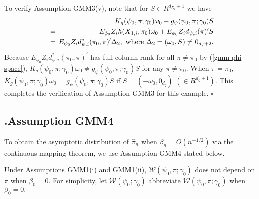 \documentclass[12pt,titlepage,final,oneside,letterpaper]{article}
\begin{document}
To verify Assumption GMM3(v), note that for $S\in R^{d_{X_{2}}+1}$ we have%
\begin{eqnarray}
&&K_{g}(\psi _{0},\pi ;\gamma _{0})\omega _{0}-g_{\psi }(\psi _{0},\pi
;\gamma _{0})S  \notag \\
\hspace{-0.08in} &=&\hspace{-0.08in}E_{\phi _{0}}Z_{i}h(X_{1,i},\pi
_{0})\omega _{0}+E_{\phi _{0}}Z_{i}d_{\psi ,i}(\pi )^{\prime }S  \notag \\
\hspace{-0.08in} &=&\hspace{-0.08in}E_{\phi _{0}}Z_{i}d_{\psi ,i}^{\ast
}(\pi _{0},\pi )^{\prime }\Delta _{2},\text{ where }\Delta _{2}=(\omega
_{0},S)\neq 0_{d_{\zeta }+2}.
\end{eqnarray}%
Because $E_{\phi _{0}}Z_{i}d_{\psi ,i}^{\ast }(\pi _{0},\pi )^{\prime }$ has
full column rank for all $\pi \neq \pi _{0}$ by (\ref{gmm phi space}), $%
K_{g}(\psi _{0},\pi ;\gamma _{0})\omega _{0}\neq g_{\psi }(\psi _{0},\pi
;\gamma _{0})S$ for any $\pi \neq \pi _{0}.$ When $\pi =\pi _{0},$ $%
K_{g}(\psi _{0},\pi ;\gamma _{0})\omega _{0}=g_{\psi }(\psi _{0},\pi ;\gamma
_{0})S$ if $S=(-\omega _{0},0_{d_{\zeta }})$ $(\in R^{d_{\zeta }+1}).$ This
completes the verification of Assumption GMM3 for this example. $\square $

\subsection{\hspace{-0.23in}\textbf{.}\hspace{0.18in}Assumption GMM4}

\hspace{0.25in}To obtain the asymptotic distribution of $\widehat{\pi }_{n}$
when $\beta _{n}=O(n^{-1/2})$ via the continuous mapping theorem, we use
Assumption GMM4 stated below.

Under Assumptions GMM1(i) and GMM1(ii), $\mathcal{W}(\psi _{0},\pi ;\gamma
_{0})$ does not depend on $\pi $ when $\beta _{0}=0.$ For simplicity, let $%
\mathcal{W}(\psi _{0};\gamma _{0})$ abbreviate $\mathcal{W}(\psi _{0},\pi
;\gamma _{0})$ when $\beta _{0}=0.$
\end{document}
